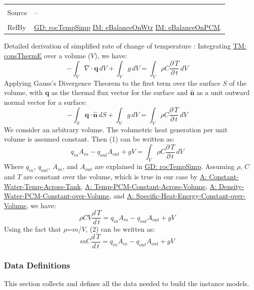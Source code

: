 \documentclass[12pt]{article}
\begin{document}
\begin{minipage}{\textwidth}
\begin{tabular}{p{} p{}}
\\ \midrule \\
Source & --
\\ \midrule \\
RefBy & \hyperref[GD:rocTempSimp]{GD: rocTempSimp} \hyperref[IM:eBalanceOnWtr]{IM: eBalanceOnWtr} \hyperref[IM:eBalanceOnPCM]{IM: eBalanceOnPCM}.
\\ \bottomrule \end{tabular}
\end{minipage}
Detailed derivation of simplified rate of change of temperature :
Integrating \hyperref[TM:consThermE]{TM: consThermE} over a volume ($V$), we have:
\begin{displaymath}
-\int_{V}{∇\cdot{}\mathbf{q}}\,dV+\int_{V}{g}\,dV=\int_{V}{ρ C \frac{\partial{}\,T}{\partial{}\,t}}\,dV
\end{displaymath}
Applying Gauss's Divergence Theorem to the first term over the surface $S$ of the volume, with $\mathbf{q}$ as the thermal flux vector for the surface and $\mathbf{\hat{n}}$ as a unit outward normal vector for a surface:
\begin{displaymath}
-\int_{S}{\mathbf{q}\cdot{}\mathbf{\hat{n}}}\,dS+\int_{V}{g}\,dV=\int_{V}{ρ C \frac{\partial{}\,T}{\partial{}\,t}}\,dV
\end{displaymath}
We consider an arbitrary volume. The volumetric heat generation per unit volume is assumed constant. Then (1) can be written as:
\begin{displaymath}
{q_{in}} {A_{in}}-{q_{out}} {A_{out}}+g V=\int_{V}{ρ C \frac{\partial{}\,T}{\partial{}\,t}}\,dV
\end{displaymath}
Where ${q_{in}}$, ${q_{out}}$, ${A_{in}}$, and ${A_{out}}$ are explained in \hyperref[GD:rocTempSimp]{GD: rocTempSimp}. Assuming $ρ$, $C$ and $T$ are constant over the volume, which is true in our case by \hyperref[assumpCWTAT]{A: Constant-Water-Temp-Across-Tank}, \hyperref[assumpTPCAV]{A: Temp-PCM-Constant-Across-Volume}, \hyperref[assumpDWPCoV]{A: Density-Water-PCM-Constant-over-Volume}, and \hyperref[assumpSHECov]{A: Specific-Heat-Energy-Constant-over-Volume}, we have:
\begin{displaymath}
ρ C V \frac{d\,T}{d\,t}={q_{in}} {A_{in}}-{q_{out}} {A_{out}}+g V
\end{displaymath}
Using the fact that $ρ$=$m$/$V$, (2) can be written as:
\begin{displaymath}
m C \frac{d\,T}{d\,t}={q_{in}} {A_{in}}-{q_{out}} {A_{out}}+g V
\end{displaymath}
\subsubsection{Data Definitions}
\label{Sec:DDs}
This section collects and defines all the data needed to build the instance models.
\par~
\end{document}
